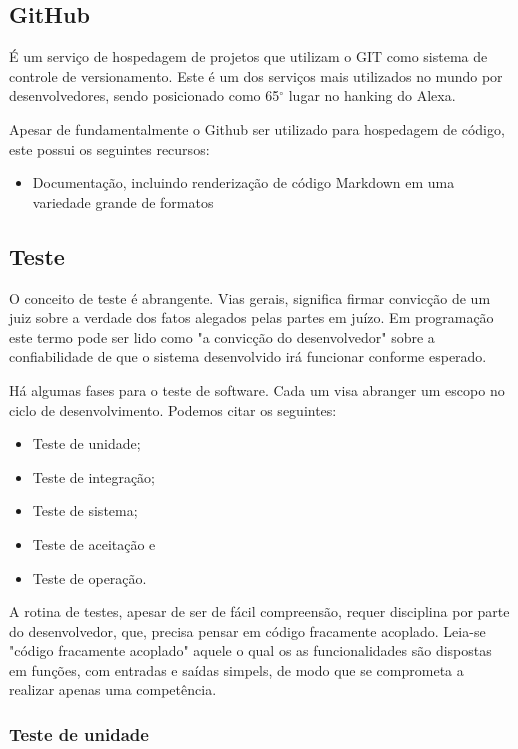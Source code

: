 \documentclass[
	article,			%
	12pt,				%
	oneside,			%
	a4paper,			%
	english,			
	brazil,
	sumario=tradicional
	]{abntex2}
\begin{document}
\subsection{GitHub}
É um serviço de hospedagem de projetos que utilizam o GIT como sistema de controle de versionamento. Este é um dos serviços mais utilizados no mundo por desenvolvedores, sendo posicionado como 65$^{\circ}$ lugar no hanking do Alexa.

Apesar de fundamentalmente o Github ser utilizado para hospedagem de código, este possui os seguintes recursos:

\begin{itemize}
	\item{Documentação, incluindo renderização de código Markdown em uma variedade grande de formatos}
\end{itemize}

\pagebreak
\subsection{Teste}

O conceito de teste é abrangente. Vias gerais, significa firmar convicção de um juiz sobre a verdade dos fatos alegados pelas partes em juízo. Em programação este termo pode ser lido como "a convicção do desenvolvedor" sobre a confiabilidade de que o sistema desenvolvido irá funcionar conforme esperado.

Há algumas fases para o teste de software. Cada um visa abranger um escopo no ciclo de desenvolvimento. Podemos citar os seguintes:
\begin{itemize}
	\item Teste de unidade;
	\item Teste de integração;
	\item Teste de sistema;
	\item Teste de aceitação e
	\item Teste de operação.
\end{itemize}

A rotina de testes, apesar de ser de fácil compreensão, requer disciplina por parte do desenvolvedor, que, precisa pensar em código fracamente acoplado. Leia-se "código fracamente acoplado" aquele o qual os as funcionalidades são dispostas em funções, com entradas e saídas simpels, de modo que se comprometa a realizar apenas uma competência.

\subsubsection{Teste de unidade}
\end{document}
